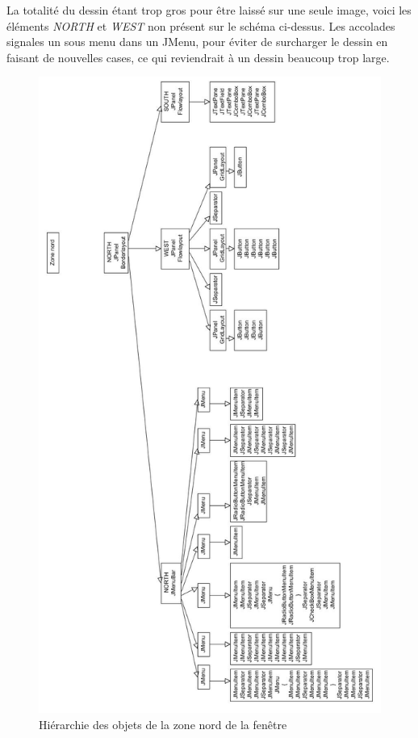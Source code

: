 \documentclass[12pt, a4paper]{article}
\begin{document}
La totalité du dessin étant trop gros pour être laissé sur une seule image, voici les éléments \emph{NORTH} et \emph{WEST} non présent sur le schéma ci-dessus. Les accolades signales un sous menu dans un JMenu, pour éviter de surcharger le dessin en faisant de nouvelles cases, ce qui reviendrait à un dessin beaucoup trop large.
\newpage
\begin{figure}[!h]
\begin{center}
   \includegraphics[scale = 0.43]{arbre_jframe_nord.jpg}
	\caption{Hiérarchie des objets de la zone nord de la fenêtre}
	\end{center}
\end{figure}
\end{document}
